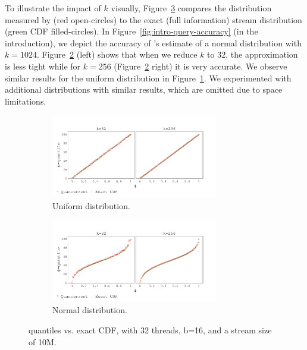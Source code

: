 To illustrate the impact of $k$ visually, Figure~\ref{fig:cdf} compares the distribution measured by \mysketch (red open-circles) to the exact (full information) stream distribution (green CDF filled-circles). In Figure~\ref{fig:intro-query-accuracy} (in the introduction), we depict the accuracy of \mysketch's estimate of a normal distribution with $k=1024$. Figure~\ref{fig:cdf_normal} (left) shows that when we reduce $k$ to $32$, the approximation is less tight while for $k=256$ (Figure~\ref{fig:cdf_normal} right) it is very accurate. We observe similar results for the uniform distribution in Figure~\ref{fig:cdf_uniform}. We experimented with additional distributions with similar results, which are omitted due to space limitations. 

\begin{figure}[h!]
\centering
    \begin{subfigure}[]{\textwidth}
        \centering
        \includegraphics[width=0.8\textwidth,trim={0.1cm 0.2cm 1.5cm 1cm},clip]
        {graphics/graphs/accuracy/Oracle_Quancurrent_blocking_numa_cdf_uniform_ks_32_256_b16_keys10M_runs1_uT_32_qT1_snapshot1_17-09-2022_06-51-43.pdf}
        \caption{Uniform distribution.} \label{fig:cdf_uniform}
    \end{subfigure}
    
    \begin{subfigure}[]{\textwidth}
        \centering
        \includegraphics[width=0.8\textwidth,trim={0.1cm 0.2cm 1.5cm 1cm},clip]
        {graphics/graphs/accuracy/Oracle_Quancurrent_blocking_numa_cdf_normal_ks_32_256_b16_keys10M_runs1_uT_32_qT1_snapshot1_17-09-2022_06-51-43.pdf}
        \caption{Normal distribution.} \label{fig:cdf_normal}
    \end{subfigure}

\caption{\mysketch quantiles vs. exact CDF, with 32 threads, b=16, and a stream size of 10M.} \label{fig:cdf}
\end{figure}

